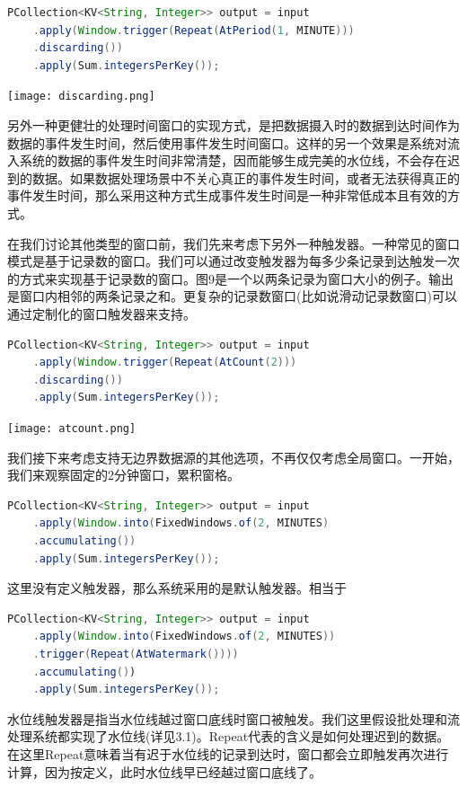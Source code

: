 \documentclass[oneside]{ctexbook}
\begin{document}
\begin{lstlisting}[language=java]
PCollection<KV<String, Integer>> output = input
    .apply(Window.trigger(Repeat(AtPeriod(1, MINUTE)))
    .discarding())
    .apply(Sum.integersPerKey());
\end{lstlisting}

\noindent \texttt{[image: discarding.png]}

另外一种更健壮的处理时间窗口的实现方式，是把数据摄入时的数据到达时间作为数据的事件发生时间，然后使用事件发生时间窗口。这样的另一个效果是系统对流入系统的数据的事件发生时间非常清楚，因而能够生成完美的水位线，不会存在迟到的数据。如果数据处理场景中不关心真正的事件发生时间，或者无法获得真正的事件发生时间，那么采用这种方式生成事件发生时间是一种非常低成本且有效的方式。

在我们讨论其他类型的窗口前，我们先来考虑下另外一种触发器。一种常见的窗口模式是基于记录数的窗口。我们可以通过改变触发器为每多少条记录到达触发一次的方式来实现基于记录数的窗口。图9是一个以两条记录为窗口大小的例子。输出是窗口内相邻的两条记录之和。更复杂的记录数窗口(比如说滑动记录数窗口)可以通过定制化的窗口触发器来支持。

\begin{lstlisting}[language=java]
PCollection<KV<String, Integer>> output = input
    .apply(Window.trigger(Repeat(AtCount(2)))
    .discarding())
    .apply(Sum.integersPerKey());
\end{lstlisting}

\noindent \texttt{[image: atcount.png]}

我们接下来考虑支持无边界数据源的其他选项，不再仅仅考虑全局窗口。一开始，我们来观察固定的2分钟窗口，累积窗格。

\begin{lstlisting}[language=java]
PCollection<KV<String, Integer>> output = input
    .apply(Window.into(FixedWindows.of(2, MINUTES)
    .accumulating())
    .apply(Sum.integersPerKey());
\end{lstlisting}

这里没有定义触发器，那么系统采用的是默认触发器。相当于

\begin{lstlisting}[language=java]
PCollection<KV<String, Integer>> output = input
    .apply(Window.into(FixedWindows.of(2, MINUTES))
    .trigger(Repeat(AtWatermark())))
    .accumulating())
    .apply(Sum.integersPerKey());
\end{lstlisting}

水位线触发器是指当水位线越过窗口底线时窗口被触发。我们这里假设批处理和流处理系统都实现了水位线(详见3.1)。Repeat代表的含义是如何处理迟到的数据。在这里Repeat意味着当有迟于水位线的记录到达时，窗口都会立即触发再次进行计算，因为按定义，此时水位线早已经越过窗口底线了。
\end{document}
